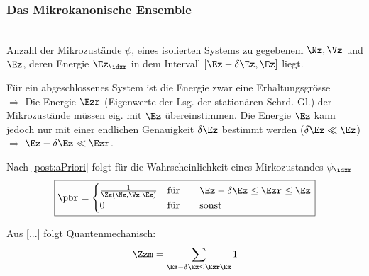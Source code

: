 \subsubsection{Das Mikrokanonische Ensemble}
\label{subsubsec:MikrokanonischeEnsemble}
\begin{defnbox}\nospacing
  \begin{defn}[\\Mikrokanonisches Zustandssumme $\Zz=\Zz(\Nz,\Vz,\Ez)$]\leavevmode\\
    Anzahl der Mikrozustände $\psi$, eines isolierten Systems zu gegebenem $\Nz,\Vz$ und $\Ez$,
    deren Energie $\Ez_{\idxr}$ in dem Intervall $[\Ez-\delta\Ez,\Ez]$ liegt.
  \end{defn}
\end{defnbox}
\begin{notebox}[Bemerkung]
  Für ein abgeschlossenes System ist die Energie zwar eine Erhaltungsgrösse\\
  $\Rightarrow$ Die Energie $\Ezr$ (Eigenwerte der Lsg. der stationären Schrd. Gl.) der Mikrozustände müssen eig. mit $\Ez$ übereinstimmen.
  Die Energie $\Ez$ kann jedoch nur mit einer endlichen Genauigkeit $\delta\Ez$ bestimmt werden ($\delta\Ez\ll\Ez$)
  $\Rightarrow$ $\Ez-\delta\Ez\ll\Ezr$.
\end{notebox}
\begin{emphbox}\nospacing
  \begin{law}
    Nach \cref{post:aPriori} folgt für die Wahrscheinlichkeit eines Mirkozustandes $\psi_{\idxr}$
    \begin{equation}\label{eq:mikrokanonischeWahr}
      \boxed{\pbr=
        \begin{cases}
          \frac{1}{\Zz(\Nz,\Vz,\Ez)} &\mbox{für}\qquad \Ez-\delta\Ez\leq\Ezr\le\Ez \\
          0 &\mbox{für}\qquad \text{sonst}
        \end{cases}}
      \end{equation}
  \end{law}
\end{emphbox}
\begin{emphbox}\nospacing
  \begin{law}
    Aus \cref{...} folgt Quantenmechanisch:
    \begin{equation}
      \Zzm=\sum_{\Ez-\delta\Ez\le\Ezr\Ez}1
    \end{equation}
  \end{law}
\end{emphbox}
